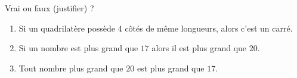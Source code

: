 
\begin{exercice}\label{exosmath-0907}

    Vrai ou faux (justifier) ?
    \begin{enumerate}
        \item
            Si un quadrilatère possède \( 4\) côtés de même longueurs, alors c'est un carré.
        \item
            Si un nombre est plus grand que \( 17\) alors il est plus grand que \( 20\).
        \item
            Tout nombre plus grand que \( 20\) est plus grand que \( 17\).
    \end{enumerate}

\end{exercice}
